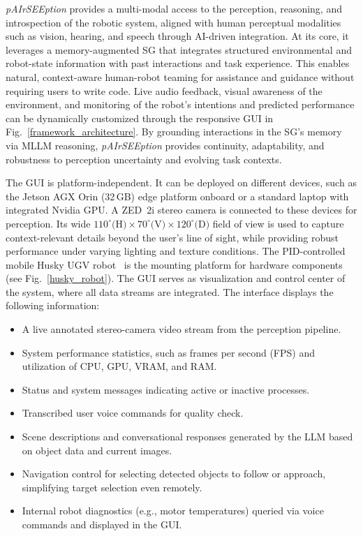 \documentclass[lettersize,journal]{IEEEtran}
\begin{document}
\textit{pAIrSEEption} provides a multi-modal access to the  perception, reasoning, and introspection of the robotic system, aligned with human perceptual modalities such as vision, hearing, and speech through AI-driven integration. At its core, it leverages a memory-augmented SG that integrates structured environmental and robot-state information with past interactions and task experience. This enables natural, context-aware human-robot teaming for assistance and guidance without requiring users to write code. Live audio feedback, visual awareness of the environment, and monitoring of the robot’s intentions and predicted performance can be dynamically customized through the responsive GUI in Fig.~\ref{framework_architecture}. By grounding interactions in the SG’s memory via MLLM reasoning, \textit{pAIrSEEption}  provides continuity, adaptability, and robustness to perception uncertainty and evolving task contexts.

The GUI is platform-independent. It can be deployed on different devices, such as the  Jetson AGX Orin (32\,GB) edge platform onboard or a standard laptop with  integrated Nvidia GPU. A ZED~2i stereo camera is connected to these devices for perception. Its wide $110^\circ\text{(H)}\times70^\circ \text{(V)}\times120^\circ \text{(D)}$  field of view is used to capture context-relevant details beyond the user’s line of sight, while providing robust performance under varying lighting and texture conditions. The PID-controlled mobile Husky UGV robot~\cite{husky} is the mounting platform for  hardware components (see Fig.~\ref{husky_robot}). The GUI serves as  visualization and control center of the system, where all  data streams are integrated. The interface displays the following information:







\begin{itemize}
	\item A live annotated stereo-camera video stream from the perception pipeline. 
	\item System performance statistics, such as frames per second (FPS) and utilization of  CPU, GPU, VRAM, and RAM.
	\item Status and system messages indicating active or inactive processes.
	\item Transcribed user voice commands for quality check.
	\item Scene descriptions and conversational responses generated by the LLM based on object data and current images.
	\item Navigation control for selecting detected objects to follow or approach, simplifying target selection even remotely.
	\item Internal robot diagnostics (e.g., motor temperatures) queried via voice commands and displayed in the GUI.
\end{itemize}
\end{document}
